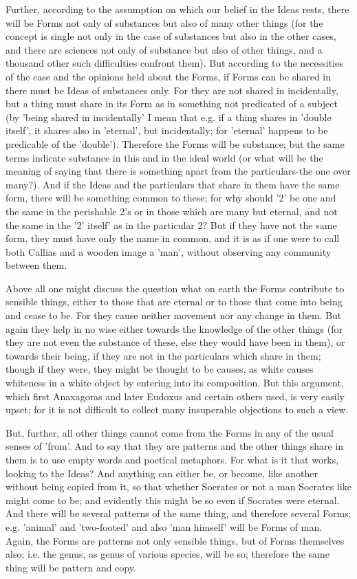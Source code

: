 \documentclass{article}
\begin{document}
Further, according to the assumption on which our belief in the Ideas rests, there will be Forms not only of substances but also of many other things (for the concept is single not only in the case of substances but also in the other cases, and there are sciences not only of substance but also of other things, and a thousand other such difficulties confront them). But according to the necessities of the case and the opinions held about the Forms, if Forms can be shared in there must be Ideas of substances only. For they are not shared in incidentally, but a thing must share in its Form as in something not predicated of a subject (by 'being shared in incidentally' I mean that e.g. if a thing shares in 'double itself', it shares also in 'eternal', but incidentally; for 'eternal' happens to be predicable of the 'double'). Therefore the Forms will be substance; but the same terms indicate substance in this and in the ideal world (or what will be the meaning of saying that there is something apart from the particulars-the one over many?). And if the Ideas and the particulars that share in them have the same form, there will be something common to these; for why should '2' be one and the same in the perishable 2's or in those which are many but eternal, and not the same in the '2' itself' as in the particular 2? But if they have not the same form, they must have only the name in common, and it is as if one were to call both Callias and a wooden image a 'man', without observing any community between them.

Above all one might discuss the question what on earth the Forms contribute to sensible things, either to those that are eternal or to those that come into being and cease to be. For they cause neither movement nor any change in them. But again they help in no wise either towards the knowledge of the other things (for they are not even the substance of these, else they would have been in them), or towards their being, if they are not in the particulars which share in them; though if they were, they might be thought to be causes, as white causes whiteness in a white object by entering into its composition. But this argument, which first Anaxagoras and later Eudoxus and certain others used, is very easily upset; for it is not difficult to collect many insuperable objections to such a view.

But, further, all other things cannot come from the Forms in any of the usual senses of 'from'. And to say that they are patterns and the other things share in them is to use empty words and poetical metaphors. For what is it that works, looking to the Ideas? And anything can either be, or become, like another without being copied from it, so that whether Socrates or not a man Socrates like might come to be; and evidently this might be so even if Socrates were eternal. And there will be several patterns of the same thing, and therefore several Forms; e.g. 'animal' and 'two-footed' and also 'man himself' will be Forms of man. Again, the Forms are patterns not only sensible things, but of Forms themselves also; i.e. the genus, as genus of various species, will be so; therefore the same thing will be pattern and copy.
\end{document}
